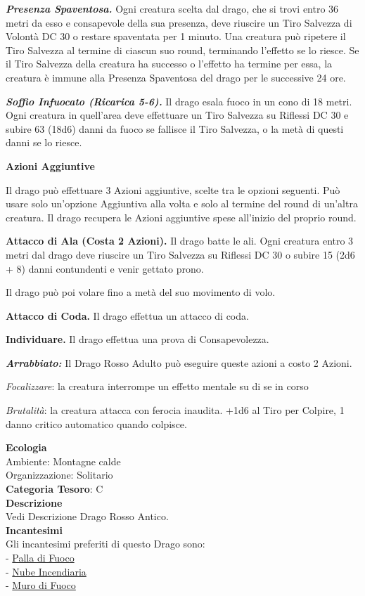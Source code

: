 \begin{multicols}{2}
{\emph{\textbf{Presenza Spaventosa.}} Ogni creatura scelta dal drago, che si trovi entro 36 metri da esso e consapevole della sua presenza, deve riuscire un Tiro Salvezza di Volontà DC 30 o restare spaventata per 1 minuto. Una creatura può ripetere il Tiro Salvezza al termine di ciascun suo round, terminando l'effetto se lo riesce. Se il Tiro Salvezza della creatura ha successo o l'effetto ha termine per essa, la creatura è immune alla Presenza Spaventosa del drago per le successive 24 ore.

\emph{\textbf{Soffio Infuocato (Ricarica 5-6).}} Il drago esala fuoco in un cono di 18 metri. Ogni creatura in quell'area deve effettuare un Tiro Salvezza su Riflessi DC 30 e subire 63 (18d6) danni da fuoco se fallisce il Tiro Salvezza, o la metà di questi danni se lo riesce.

\textbf{Azioni Aggiuntive}

Il drago può effettuare 3 Azioni aggiuntive, scelte tra le opzioni seguenti. Può usare solo un'opzione Aggiuntiva alla volta e solo al termine del round di un'altra creatura. Il drago recupera le Azioni aggiuntive spese all'inizio del proprio round.

\textbf{Attacco di Ala (Costa 2 Azioni).} Il drago batte le ali. Ogni creatura entro 3 metri dal drago deve riuscire un Tiro Salvezza su Riflessi DC 30 o subire 15 (2d6 + 8) danni contundenti e venir gettato prono.

Il drago può poi volare fino a metà del suo movimento di volo.

\textbf{Attacco di Coda.} Il drago effettua un attacco di coda.

\textbf{Individuare.} Il drago effettua una prova di Consapevolezza.

\emph{\textbf{Arrabbiato:}} Il Drago Rosso Adulto può eseguire queste azioni a costo 2 Azioni.

\emph{Focalizzare}: la creatura interrompe un effetto mentale su di se in corso

\emph{Brutalità}: la creatura attacca con ferocia inaudita. +1d6 al Tiro per Colpire, 1 danno critico automatico quando colpisce.

\textbf{Ecologia}\\
Ambiente: Montagne calde\\
Organizzazione: Solitario\\
\textbf{Categoria Tesoro}: C\\
\textbf{Descrizione}\\
Vedi Descrizione Drago Rosso Antico.\\
\textbf{Incantesimi}\\
Gli incantesimi preferiti di questo Drago sono:\\
- \hyperlink{Palla di Fuoco}{Palla di Fuoco}\\
- \hyperlink{Nube Incendiaria}{Nube Incendiaria}\\
- \hyperlink{Muro di Fuoco}{Muro di Fuoco}


}
\end{multicols}
